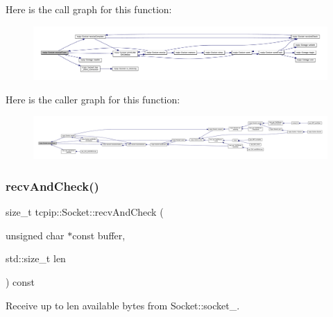Here is the call graph for this function\+:\nopagebreak
\begin{figure}[H]
\begin{center}
\leavevmode
\includegraphics[width=350pt]{classtcpip_1_1_socket_a0d00337ac1fbad2cf183f0a651539e2e_cgraph}
\end{center}
\end{figure}
Here is the caller graph for this function\+:\nopagebreak
\begin{figure}[H]
\begin{center}
\leavevmode
\includegraphics[width=350pt]{classtcpip_1_1_socket_a0d00337ac1fbad2cf183f0a651539e2e_icgraph}
\end{center}
\end{figure}
\mbox{\label{classtcpip_1_1_socket_a30a24c05b20d9c3ec54239e75268cda8}} 
\subsubsection{\texorpdfstring{recv\+And\+Check()}{recvAndCheck()}}
{\footnotesize\ttfamily size\+\_\+t tcpip\+::\+Socket\+::recv\+And\+Check (\begin{DoxyParamCaption}\item[{unsigned char $\ast$const}]{buffer,  }\item[{std\+::size\+\_\+t}]{len }\end{DoxyParamCaption}) const\hspace{0.3cm}{\ttfamily [protected]}}



Receive up to {\ttfamily len} available bytes from Socket\+::socket\+\_\+. 

